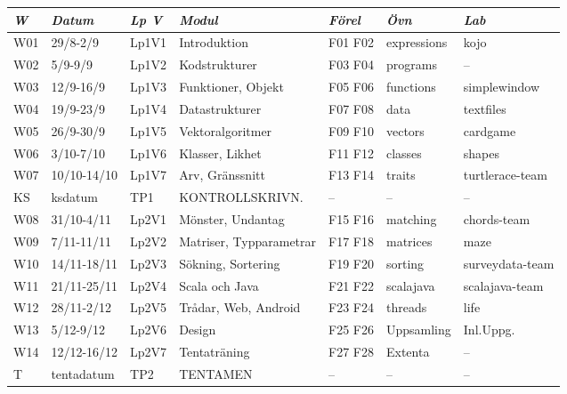 \begin{tabular}{l|l|l|l|l|l|l}
\textit{W} & \textit{Datum} & \textit{Lp V} & \textit{Modul} & \textit{Förel} & \textit{Övn} & \textit{Lab} \\ \hline \hline
W01 & 29/8-2/9    & Lp1V1 & Introduktion            & F01 F02 & expressions & kojo            \\
W02 & 5/9-9/9     & Lp1V2 & Kodstrukturer           & F03 F04 & programs    & --              \\
W03 & 12/9-16/9   & Lp1V3 & Funktioner, Objekt      & F05 F06 & functions   & simplewindow    \\
W04 & 19/9-23/9   & Lp1V4 & Datastrukturer          & F07 F08 & data        & textfiles       \\
W05 & 26/9-30/9   & Lp1V5 & Vektoralgoritmer        & F09 F10 & vectors     & cardgame        \\
W06 & 3/10-7/10   & Lp1V6 & Klasser, Likhet         & F11 F12 & classes     & shapes          \\
W07 & 10/10-14/10 & Lp1V7 & Arv, Gränssnitt         & F13 F14 & traits      & turtlerace-team \\
KS  & ksdatum     & TP1   & KONTROLLSKRIVN.         & --      & --          & --              \\
W08 & 31/10-4/11  & Lp2V1 & Mönster, Undantag       & F15 F16 & matching    & chords-team     \\
W09 & 7/11-11/11  & Lp2V2 & Matriser, Typparametrar & F17 F18 & matrices    & maze            \\
W10 & 14/11-18/11 & Lp2V3 & Sökning, Sortering      & F19 F20 & sorting     & surveydata-team \\
W11 & 21/11-25/11 & Lp2V4 & Scala och Java          & F21 F22 & scalajava   & scalajava-team  \\
W12 & 28/11-2/12  & Lp2V5 & Trådar, Web, Android    & F23 F24 & threads     & life            \\
W13 & 5/12-9/12   & Lp2V6 & Design                  & F25 F26 & Uppsamling  & Inl.Uppg.       \\
W14 & 12/12-16/12 & Lp2V7 & Tentaträning            & F27 F28 & Extenta     & --              \\
T   & tentadatum  & TP2   & TENTAMEN                & --      & --          & --              \\
\end{tabular}
